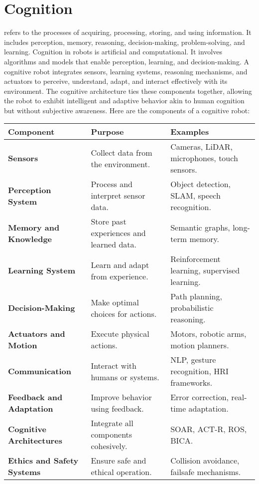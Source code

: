 \section{Cognition}
refers to the processes of acquiring, processing, storing, and using information. It includes perception, memory, reasoning, decision-making, problem-solving, and learning. Cognition in robots is artificial and computational. It involves algorithms and models that enable perception, learning, and decision-making. A cognitive robot integrates sensors, learning systems, reasoning mechanisms, and actuators to perceive, understand, adapt, and interact effectively with its environment. The cognitive architecture ties these components together, allowing the robot to exhibit intelligent and adaptive behavior akin to human cognition but without subjective awareness. Here are the components of a cognitive robot:
    \begin{tabular}{|l|l|l|}
        \hline
        \textbf{Component} & \textbf{Purpose} & \textbf{Examples} \\ \hline
        \textbf{Sensors} & Collect data from the environment. & Cameras, LiDAR, microphones, touch sensors. \\ \hline
        \textbf{Perception System} & Process and interpret sensor data. & Object detection, SLAM, speech recognition. \\ \hline
        \textbf{Memory and Knowledge} & Store past experiences and learned data. & Semantic graphs, long-term memory. \\ \hline
        \textbf{Learning System} & Learn and adapt from experience. & Reinforcement learning, supervised learning. \\ \hline
        \textbf{Decision-Making} & Make optimal choices for actions. & Path planning, probabilistic reasoning. \\ \hline
        \textbf{Actuators and Motion} & Execute physical actions. & Motors, robotic arms, motion planners. \\ \hline
        \textbf{Communication} & Interact with humans or systems. & NLP, gesture recognition, HRI frameworks. \\ \hline
        \textbf{Feedback and Adaptation} & Improve behavior using feedback. & Error correction, real-time adaptation. \\ \hline
        \textbf{Cognitive Architectures} & Integrate all components cohesively. & SOAR, ACT-R, ROS, BICA. \\ \hline
        \textbf{Ethics and Safety Systems} & Ensure safe and ethical operation. & Collision avoidance, failsafe mechanisms. \\ \hline
    \end{tabular}




